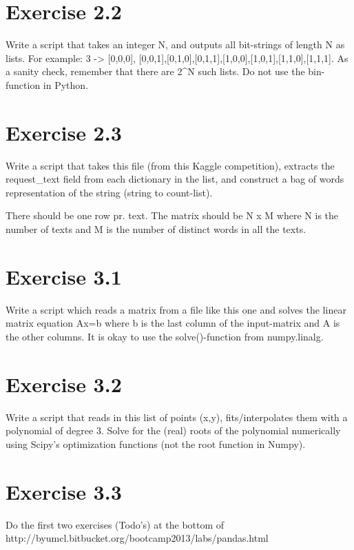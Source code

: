 \documentclass{article}
\begin{document}
\section{Exercise 2.2}
Write a script that takes an integer N, and outputs all bit-strings of length N as lists. For example: 3 -> [0,0,0], [0,0,1],[0,1,0],[0,1,1],[1,0,0],[1,0,1],[1,1,0],[1,1,1]. As a sanity check, remember that there are 2^N such lists. Do not use the bin-function in Python.


\section{Exercise 2.3}
Write a script that takes this file (from this Kaggle competition), extracts the request_text field from each dictionary in the list, and construct a bag of words representation of the string (string to count-list).

There should be one row pr. text. The matrix should be N x M where N is the number of texts and M is the number of distinct words in all the texts.


\section{Exercise 3.1}
Write a script which reads a matrix from a file like this one and solves the linear matrix equation Ax=b where b is the last column of the input-matrix and A is the other columns. It is okay to use the solve()-function from numpy.linalg.


\section{Exercise 3.2}
Write a script that reads in this list of points (x,y), fits/interpolates them with a polynomial of degree 3. Solve for the (real) roots of the polynomial numerically using Scipy’s optimization functions (not the root function in Numpy).


\section{Exercise 3.3}
Do the first two exercises (Todo’s) at the bottom of http://byumcl.bitbucket.org/bootcamp2013/labs/pandas.html

\end{document}
